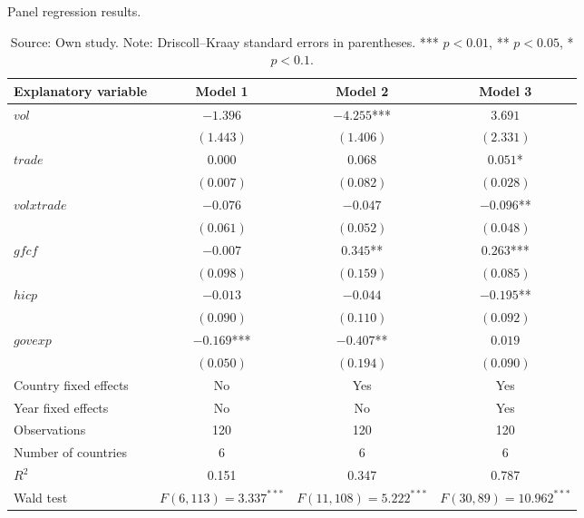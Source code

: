 \begin{table}[H]
    \centering
    \caption{Panel regression results.}
    \vspace{\baselineskip}
    \small
    \begin{tabular}{lccc}
        \toprule
        \textbf{Explanatory variable} & \textbf{Model 1} & \textbf{Model 2} & \textbf{Model 3} \\
        \midrule
        $vol$            & $-1.396$   & $-4.255$*** & $3.691$ \\
                              & $(1.443)$  & $(1.406)$         & $(2.331)$ \\[2pt]
       $trade$       & $0.000$    & $0.068$           & $0.051$* \\
                              & $(0.007)$  & $(0.082)$         & $(0.028)$ \\[2pt]
        $vol x trade$ & $-0.076$ & $-0.047$        & $-0.096$** \\
                              & $(0.061)$  & $(0.052)$         & $(0.048)$ \\[2pt]
        $gfcf$                  & $-0.007$   & $0.345$** & $0.263$*** \\
                              & $(0.098)$  & $(0.159)$         & $(0.085)$ \\[2pt]
        $hicp$                  & $-0.013$   & $-0.044$          & $-0.195$** \\
                              & $(0.090)$  & $(0.110)$         & $(0.092)$ \\[2pt]
        $govexp$ & $-0.169$*** & $-0.407$** & $0.019$ \\
                              & $(0.050)$  & $(0.194)$         & $(0.090)$ \\
        \midrule
        Country fixed effects & No  & Yes & Yes \\
        Year fixed effects    & No  & No  & Yes \\
        Observations          & 120 & 120 & 120 \\
        Number of countries   & 6   & 6   & 6 \\
        $R^2$                 & 0.151 & 0.347 & 0.787 \\
        Wald test & $F(6,113) = 3.337^{***}$ & $F(11,108) = 5.222^{***}$ & $F(30,89) = 10.962^{***}$ \\
        \bottomrule
    \end{tabular}
    \vspace{\baselineskip}
    \caption*{\footnotesize Source: Own study. Note: Driscoll--Kraay standard errors in
    parentheses. *** $p<0.01$, ** $p<0.05$, * $p<0.1$.}
    \label{tab:panel_results}
\end{table}

